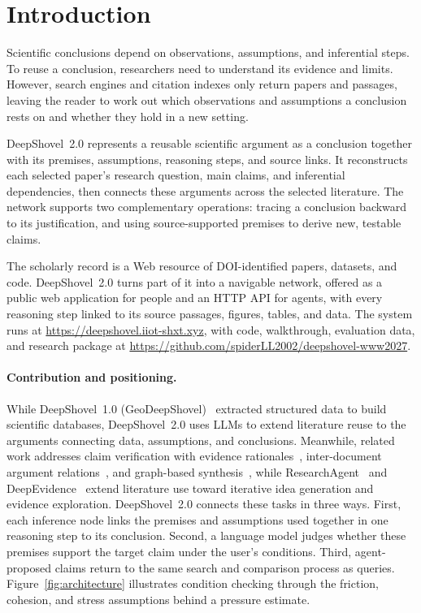 \documentclass[sigconf,screen,review]{acmart}
\newcommand{\sys}{DeepShovel~2.0}
\begin{document}
\section{Introduction}
Scientific conclusions depend on observations, assumptions, and inferential steps. To reuse a conclusion, researchers need to understand its evidence and limits. However, search engines and citation indexes only return papers and passages, leaving the reader to work out which observations and assumptions a conclusion rests on and whether they hold in a new setting.

\sys{} represents a reusable scientific argument as a conclusion together with its premises, assumptions, reasoning steps, and source links. It reconstructs each selected paper's research question, main claims, and inferential dependencies, then connects these arguments across the selected literature. The network supports two complementary operations: tracing a conclusion backward to its justification, and using source-supported premises to derive new, testable claims.

The scholarly record is a Web resource of DOI-identified papers, datasets, and code. \sys{} turns part of it into a navigable network, offered as a public web application for people and an HTTP API for agents, with every reasoning step linked to its source passages, figures, tables, and data. The system runs at \url{https://deepshovel.iiot-shxt.xyz}, with code, walkthrough, evaluation data, and research package at \url{https://github.com/spiderLL2002/deepshovel-www2027}.

\paragraph{Contribution and positioning.}
While DeepShovel~1.0 (Geo\-Deep\-Shovel)~\cite{geodeepshovel} extracted structured data to build scientific databases, \sys{} uses LLMs to extend literature reuse to the arguments connecting data, assumptions, and conclusions. Meanwhile, related work addresses claim verification with evidence rationales~\cite{scifact}, inter-document argument relations~\cite{argumentweb}, and graph-based synthesis~\cite{graphrag}, while Research\-Agent~\cite{researchagent} and DeepEvidence~\cite{deepevidence} extend literature use toward iterative idea generation and evidence exploration. \sys{} connects these tasks in three ways. First, each inference node links the premises and assumptions used together in one reasoning step to its conclusion. Second, a language model judges whether these premises support the target claim under the user's conditions. Third, agent-proposed claims return to the same search and comparison process as queries. Figure~\ref{fig:architecture} illustrates condition checking through the friction, cohesion, and stress assumptions behind a pressure estimate.
\end{document}
